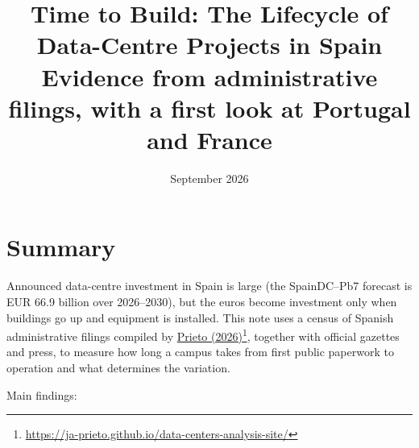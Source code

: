 \documentclass[11pt]{article}
\title{Time to Build: The Lifecycle of Data-Centre Projects in Spain\\
\large Evidence from administrative filings, with a first look at Portugal and France}
\author{}
\date{September 2026}
\newcommand{\src}[2]{\href{#1}{#2}\footnote{\url{#1}}}
\begin{document}
\maketitle

\section*{Summary}

Announced data-centre investment in Spain is large (the SpainDC--Pb7 forecast is EUR 66.9 billion over 2026--2030), but the euros become investment only when buildings go up and equipment is installed. This note uses a census of Spanish administrative filings compiled by \src{https://ja-prieto.github.io/data-centers-analysis-site/}{Prieto (2026)}, together with official gazettes and press, to measure how long a campus takes from first public paperwork to operation and what determines the variation.

Main findings:
\end{document}
